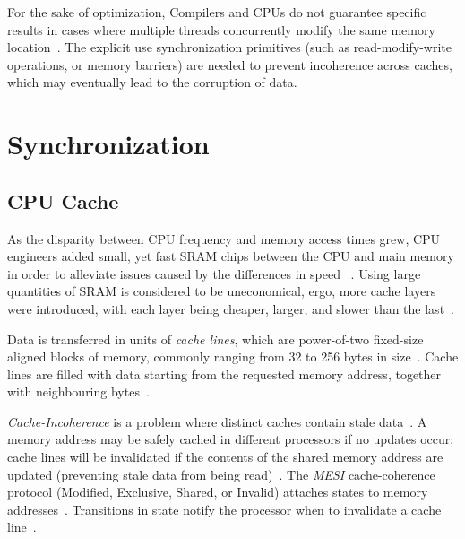 For the sake of optimization, Compilers and CPUs do not guarantee specific
results in cases where multiple threads concurrently modify the same memory
location~\citep{drepper2007every}. The explicit use synchronization primitives
(such as read-modify-write operations, or memory barriers) are needed to
prevent incoherence across caches, which may eventually lead to the corruption
of data.

\section{Synchronization}
\subsection{CPU Cache}
As the disparity between CPU frequency and memory access times grew, 
CPU engineers added small, yet fast SRAM chips between the CPU
and main memory in order to alleviate issues caused by the differences in speed
~\citep{cantrill2008real,drepper2007every,perfbook2021}. Using large
quantities of SRAM is considered to be uneconomical, ergo, more cache layers
were introduced, with each layer being cheaper, larger, and slower than the
last~\citep{drepper2007every,perfbook2021}.

Data is transferred in units of \emph{cache lines}, which are power-of-two
fixed-size aligned blocks of memory, commonly ranging from 32 to 256 bytes in
size~\citep{perfbook2021_cacheline}. Cache lines are filled with data
starting from the requested memory address, together with neighbouring bytes~\citep{perfbook2021_cacheline}.


\emph{Cache-Incoherence} is a problem where distinct caches contain stale
data~\citep{herlihy2020art_cachecoherence}. A memory address
may be safely cached in different processors if no updates occur; 
cache lines will be invalidated if the contents of the shared memory address are
updated (preventing stale data from being
read)~\citep{herlihy2020art_cachecoherence}.
The \emph{MESI} cache-coherence protocol (Modified, Exclusive, Shared, or
Invalid) attaches states to memory
addresses~\citep{herlihy2020art_cachecoherence}. Transitions in state notify
the processor when to invalidate a cache
line~\citep{herlihy2020art_cachecoherence}.

